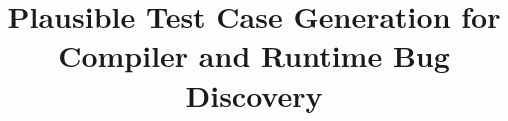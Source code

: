 



\title{Plausible Test Case Generation for Compiler and Runtime Bug Discovery}

%
%

\maketitle















\printbibliography


